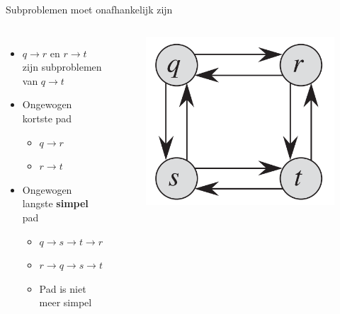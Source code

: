 \documentclass
   [kulak] %
   {kulakbeamer}
\begin{document}
\begin{frame}{Subproblemen moet onafhankelijk zijn}
\begin{columns}
    \begin{itemize}
        \item<1-> $q \xrightarrow{} r$ en $r \xrightarrow{} t$ zijn subproblemen van $q \xrightarrow{} t$
        \item<2-> Ongewogen kortste pad
        \begin{itemize}
            \item<2-> $q \xrightarrow{} r$
            \item<2-> $r \xrightarrow{} t$
        \end{itemize}
        \item<3-> Ongewogen langste \textbf{simpel} pad
        \begin{itemize}
            \item<4-> $q \xrightarrow{} s \xrightarrow{} t \xrightarrow{} r$
            \item<5-> $r \xrightarrow{} q \xrightarrow{} s \xrightarrow{} t$
            \item<6-> Pad is niet meer simpel
        \end{itemize}
    \end{itemize}
    \begin{figure}
        \centering
        \includegraphics[width=\linewidth]{graph.png}
    \end{figure}
\end{columns}
\end{frame}
\end{document}
